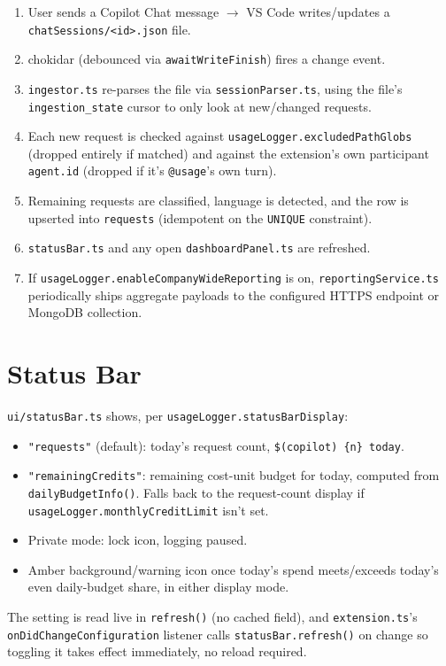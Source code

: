 \documentclass[11pt,a4paper]{article}
\newcommand{\code}[1]{\texttt{\color{lloydsblue!80!black}#1}}
\begin{document}
\begin{enumerate}[leftmargin=1.6em]
  \item User sends a Copilot Chat message $\rightarrow$ VS Code writes/updates a \code{chatSessions/<id>.json} file.
  \item chokidar (debounced via \code{awaitWriteFinish}) fires a change event.
  \item \code{ingestor.ts} re-parses the file via \code{sessionParser.ts}, using the file's \code{ingestion\_state} cursor to only look at new/changed requests.
  \item Each new request is checked against \code{usageLogger.excludedPathGlobs} (dropped entirely if matched) and against the extension's own participant \code{agent.id} (dropped if it's \code{@usage}'s own turn).
  \item Remaining requests are classified, language is detected, and the row is upserted into \code{requests} (idempotent on the \code{UNIQUE} constraint).
  \item \code{statusBar.ts} and any open \code{dashboardPanel.ts} are refreshed.
  \item If \code{usageLogger.enableCompanyWideReporting} is on, \code{reportingService.ts} periodically ships aggregate payloads to the configured HTTPS endpoint or MongoDB collection.
\end{enumerate}

\section{Status Bar}

\code{ui/statusBar.ts} shows, per \code{usageLogger.statusBarDisplay}:

\begin{itemize}[leftmargin=1.4em]
  \item \code{"requests"} (default): today's request count, \code{\$(copilot) \{n\} today}.
  \item \code{"remainingCredits"}: remaining cost-unit budget for today, computed from \code{dailyBudgetInfo()}. Falls back to the request-count display if \code{usageLogger.monthlyCreditLimit} isn't set.
  \item Private mode: lock icon, logging paused.
  \item Amber background/warning icon once today's spend meets/exceeds today's even daily-budget share, in either display mode.
\end{itemize}

The setting is read live in \code{refresh()} (no cached field), and
\code{extension.ts}'s \code{onDidChangeConfiguration} listener calls
\code{statusBar.refresh()} on change so toggling it takes effect
immediately, no reload required.
\end{document}

